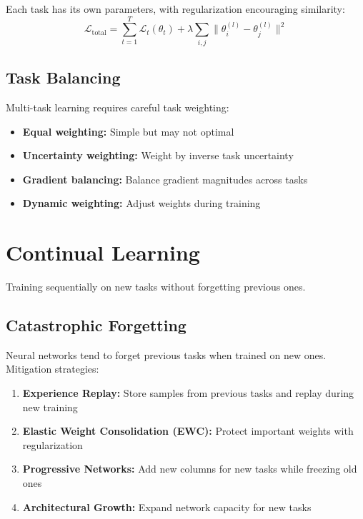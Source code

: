 Each task has its own parameters, with regularization encouraging similarity:
\begin{equation}
\mathcal{L}_{\text{total}} = \sum_{t=1}^{T} \mathcal{L}_t(\theta_t) + \lambda \sum_{i,j} \|\theta_i^{(l)} - \theta_j^{(l)}\|^2
\end{equation}

\subsection{Task Balancing}

Multi-task learning requires careful task weighting:
\begin{itemize}
    \item \textbf{Equal weighting:} Simple but may not optimal
    \item \textbf{Uncertainty weighting:} Weight by inverse task uncertainty \cite{kendall2018multi}
    \item \textbf{Gradient balancing:} Balance gradient magnitudes across tasks
    \item \textbf{Dynamic weighting:} Adjust weights during training
\end{itemize}

\section{Continual Learning}

Training sequentially on new tasks without forgetting previous ones.

\subsection{Catastrophic Forgetting}

Neural networks tend to forget previous tasks when trained on new ones. Mitigation strategies:

\begin{enumerate}
    \item \textbf{Experience Replay:} Store samples from previous tasks and replay during new training
    \item \textbf{Elastic Weight Consolidation (EWC):} Protect important weights with regularization \cite{kirkpatrick2017overcoming}
    \item \textbf{Progressive Networks:} Add new columns for new tasks while freezing old ones
    \item \textbf{Architectural Growth:} Expand network capacity for new tasks
\end{enumerate}

